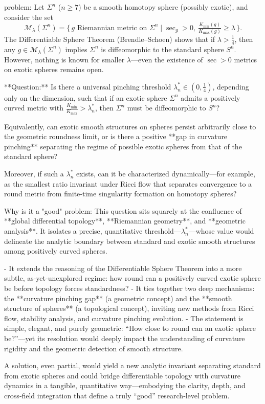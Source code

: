 problem:  
Let $\Sigma^n$ ($n\ge7$) be a smooth homotopy sphere (possibly exotic), and consider the set
\[
\mathcal{M}_\lambda(\Sigma^n)=\{\, g\text{ Riemannian metric on }\Sigma^n\mid \sec_g>0,\ \tfrac{K_{\min}(g)}{K_{\max}(g)}\ge \lambda \,\}.
\]
The Differentiable Sphere Theorem (Brendle–Schoen) shows that if $\lambda > \frac14$, then any $g\in\mathcal{M}_\lambda(\Sigma^n)$ implies $\Sigma^n$ is diffeomorphic to the standard sphere $S^n$.  
However, nothing is known for smaller $\lambda$—even the existence of $\sec>0$ metrics on exotic spheres remains open.

**Question:**  
Is there a universal pinching threshold $\lambda^*_n\in(0,\frac14)$, depending only on the dimension, such that if an exotic sphere $\Sigma^n$ admits a positively curved metric with $\frac{K_{\min}}{K_{\max}}>\lambda^*_n$, then $\Sigma^n$ must be diffeomorphic to $S^n$?  

Equivalently, can exotic smooth structures on spheres persist arbitrarily close to the geometric roundness limit, or is there a positive **gap in curvature pinching** separating the regime of possible exotic spheres from that of the standard sphere?  

Moreover, if such a $\lambda^*_n$ exists, can it be characterized dynamically—for example, as the smallest ratio invariant under Ricci flow that separates convergence to a round metric from finite‑time singularity formation on homotopy spheres?

Why is it a "good" problem:  
This question sits squarely at the confluence of **global differential topology**, **Riemannian geometry**, and **geometric analysis**.  
It isolates a precise, quantitative threshold—$\lambda^*_n$—whose value would delineate the analytic boundary between standard and exotic smooth structures among positively curved spheres.  

- It extends the reasoning of the Differentiable Sphere Theorem into a more subtle, as‑yet‑unexplored regime: how round can a positively curved exotic sphere be before topology forces standardness?  
- It ties together two deep mechanisms: the **curvature pinching gap** (a geometric concept) and the **smooth structure of spheres** (a topological concept), inviting new methods from Ricci flow, stability analysis, and curvature pinching evolution.  
- The statement is simple, elegant, and purely geometric: “How close to round can an exotic sphere be?”—yet its resolution would deeply impact the understanding of curvature rigidity and the geometric detection of smooth structure.  

A solution, even partial, would yield a new analytic invariant separating standard from exotic spheres and could bridge differentiable topology with curvature dynamics in a tangible, quantitative way—embodying the clarity, depth, and cross‑field integration that define a truly “good” research‑level problem.